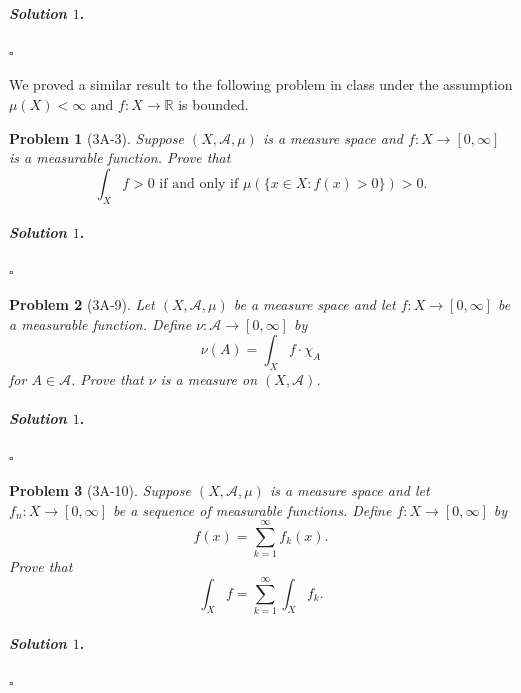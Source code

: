 \documentclass[reqno]{amsart}
\theoremstyle{plain}
\newtheorem{problem}{Problem}
\theoremstyle{definition}
\newenvironment{solution1}{\paragraph{\emph{Solution $1$}.}}{\hfill$\square$}
\begin{document}
\begin{solution1}

\end{solution1}


We proved a similar result to the following problem in class under the assumption $\mu(X)< \infty$ and $f: X \rightarrow \mathbb{R}$ is bounded.
\begin{problem}[3A-3]
Suppose $(X,\mathcal{A},\mu)$ is a measure space and $f:X \rightarrow [0,\infty]$ is a measurable function.  Prove that
$$\int_{X}f > 0 \text{ if and only if } \mu(\{x \in X : f(x) > 0\})> 0. $$
\end{problem}
\begin{solution1}

\end{solution1}

\begin{problem}[3A-9]
Let $(X,\mathcal{A},\mu)$ be a measure space and let $f: X \rightarrow [0,\infty]$ be a measurable function.  Define $\nu:\mathcal{A} \rightarrow [0,\infty]$ by
$$\nu(A) = \int_{X} f \cdot \chi_{A} $$
for $A \in \mathcal{A}$.  Prove that $\nu$ is a measure on $(X,\mathcal{A})$.
\end{problem}
\begin{solution1}

\end{solution1}





\begin{problem}[3A-10]
Suppose $(X,\mathcal{A},\mu)$ is a measure space and let $f_{n}: X \rightarrow [0,\infty]$ be a sequence of measurable functions.  Define $f:X \rightarrow [0,\infty]$ by
$$f(x) = \sum_{k=1}^{\infty}f_{k}(x). $$
Prove that
$$\int_{X} f = \sum_{k=1}^{\infty} \int_{X}f_{k}. $$
\end{problem}
\begin{solution1}

\end{solution1}
\end{document}
